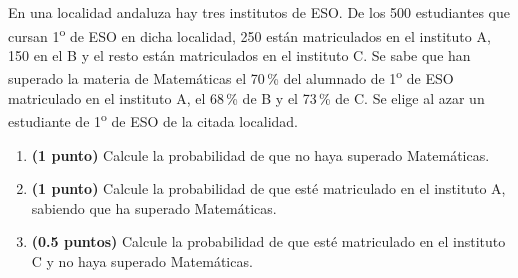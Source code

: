 
En una localidad andaluza hay tres institutos de ESO. De los 500 estudiantes
que cursan 1\textsuperscript{o} de ESO en dicha localidad, 250 están
matriculados en el instituto A, 150 en el B y el resto están matriculados
en el instituto C. Se sabe que han superado la materia de Matemáticas el
70\,\% del alumnado de 1\textsuperscript{o} de ESO matriculado en el
instituto A, el 68\,\% de B y el 73\,\% de C. Se elige al azar un
estudiante de 1\textsuperscript{o} de ESO de la citada localidad.

\begin{enumerate}[label=\alph*)]
  \item \textbf{(1 punto)} Calcule la probabilidad de que no haya superado
  Matemáticas.
  \item \textbf{(1 punto)} Calcule la probabilidad de que esté matriculado
  en el instituto A, sabiendo que ha superado Matemáticas.
  \item \textbf{(0.5 puntos)} Calcule la probabilidad de que esté
  matriculado en el instituto C y no haya superado Matemáticas.
\end{enumerate}
